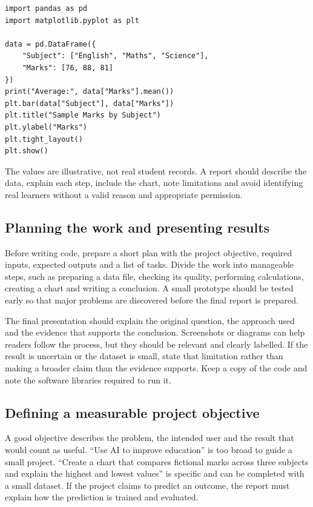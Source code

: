\documentclass[11pt,openany,oneside]{book}
\begin{document}
\begin{lstlisting}[style=pythonstyle]
import pandas as pd
import matplotlib.pyplot as plt

data = pd.DataFrame({
    "Subject": ["English", "Maths", "Science"],
    "Marks": [76, 88, 81]
})
print("Average:", data["Marks"].mean())
plt.bar(data["Subject"], data["Marks"])
plt.title("Sample Marks by Subject")
plt.ylabel("Marks")
plt.tight_layout()
plt.show()
\end{lstlisting}
The values are illustrative, not real student records. A report should describe the data, explain each step, include the chart, note limitations and avoid identifying real learners without a valid reason and appropriate permission.

\subsection{Planning the work and presenting results}
Before writing code, prepare a short plan with the project objective, required inputs, expected outputs and a list of tasks. Divide the work into manageable steps, such as preparing a data file, checking its quality, performing calculations, creating a chart and writing a conclusion. A small prototype should be tested early so that major problems are discovered before the final report is prepared.

The final presentation should explain the original question, the approach used and the evidence that supports the conclusion. Screenshots or diagrams can help readers follow the process, but they should be relevant and clearly labelled. If the result is uncertain or the dataset is small, state that limitation rather than making a broader claim than the evidence supports. Keep a copy of the code and note the software libraries required to run it.

\subsection{Defining a measurable project objective}
A good objective describes the problem, the intended user and the result that would count as useful. “Use AI to improve education” is too broad to guide a small project. “Create a chart that compares fictional marks across three subjects and explain the highest and lowest values” is specific and can be completed with a small dataset. If the project claims to predict an outcome, the report must explain how the prediction is trained and evaluated.
\end{document}
